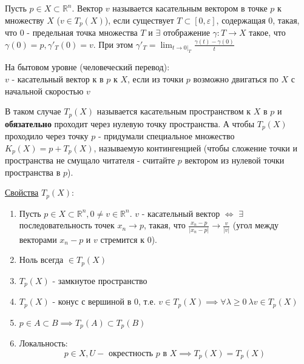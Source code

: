 \begin{definition}
    Пусть $p \in X \subset \mathbb{R}^n$. Вектор $v$ называется касательным вектором в точке $p$ к множеству $X$ ($v \in T_p(X)$), если существует $ T \subset \left[ 0, \varepsilon\right]$, содержащая $0$, такая, что $0$ - предельная точка множества $T$
    и $\exists$ отображение $\gamma: T \to X$ такое, что $\gamma(0) = p, \gamma'_T(0) = v$. При этом $\gamma'_T = \lim_{t \to 0|_T}\frac{\gamma(t) - \gamma(0)}{t}$
    \par
    На бытовом уровне (человеческий перевод): \\
    $v$ - касательный вектор к в $p$ к $X$, если из точки $p$ возможно двигаться по $X$ с начальной скоростью $v$
    \par
    В таком случае $T_p(X)$ называется касательным пространством к $X$ в $p$ и \textbf{обязательно} проходит через нулевую точку пространства. А чтобы $T_p(X)$ проходило через точку $p$ - придумали специальное множество $K_p(X) = p + T_p(X)$, называемую контингенцией (чтобы сложение точки и пространства не смущало читателя - считайте $p$ вектором из нулевой точки пространства в $p$).
\end{definition}

\newpage
\begin{theorem}
    \underline{Свойства} $T_p(X)$:
    \begin{enumerate}
        \item Пусть $p \in X \subset \mathbb{R}^n, 0 \neq v \in \mathbb{R}^n$. $v$ - касательный вектор $\iff$ $\exists$ последовательность точек $x_n \to p$, такая, что $\frac{x_n - p}{\left| x_n - p \right|} \to \frac{v}{\left| v \right|}$ (угол между векторами $x_n - p$ и $v$ стремится к $0$).
        \item Ноль всегда $\in T_p(X)$
        \item $T_p(X)$ - замкнутое пространство
        \item $T_p(X)$ - конус с вершиной в 0, т.е. $v \in T_p(X) \implies \forall \lambda \geq 0 \ \lambda v \in T_p(X)$
        \item $p \in A \subset B \implies T_p(A) \subset T_p(B)$
        \item Локальность:
        \[p \in X, U - \text{ окрестность } p \text{ в } X \implies T_p(X) = T_p(X)\]
    \end{enumerate}
\end{theorem}

